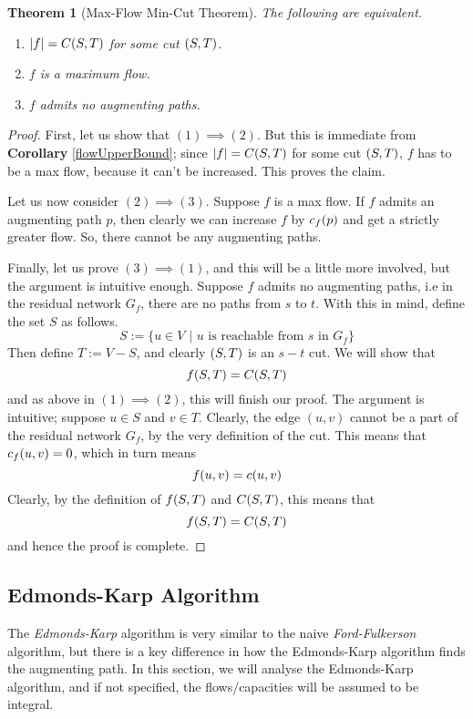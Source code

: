 \documentclass[12pt,a4paper]{amsart}
\numberwithin{equation}{section}
\newtheorem{Th}{Theorem}[section]
\theoremstyle{definition}
\begin{document}
\begin{Th}[Max-Flow Min-Cut Theorem]
	The following are equivalent. 
	\begin{enumerate}
		\item $|f| = C(S, T)$ for some cut $(S, T)$. 
		\item $f$ is a maximum flow. 
		\item $f$ admits no augmenting paths. 
	\end{enumerate}
\end{Th}
\begin{proof}
	First, let us show that $(1)\implies(2)$. But this is immediate from \textbf{Corollary} \ref{flowUpperBound}; since $|f| = C(S, T)$ for some cut $(S, T)$, $f$ has to be a max flow, because it can't be increased. This proves the claim. 
	
	Let us now consider $(2)\implies(3)$. Suppose $f$ is a max flow. If $f$ admits an augmenting path $p$, then clearly we can increase $f$ by $c_f(p)$ and get a strictly greater flow. So, there cannot be any augmenting paths. 
	
	Finally, let us prove $(3)\implies (1)$, and this will be a little more involved, but the argument is intuitive enough. Suppose $f$ admits no augmenting paths, i.e in the residual network $G_f$, there are no paths from $s$ to $t$. With this in mind, define the set $S$ as follows. 
	$$S := \{u\in V\,\,|\,\,\text{$u$ is reachable from $s$ in $G_f$}\}$$
	Then define $T := V - S$, and clearly $(S, T)$ is an $s-t$ cut. We will show that 
	$$f(S, T) = C(S, T)$$
	and as above in $(1)\implies (2)$, this will finish our proof. The argument is intuitive; suppose $u\in S$ and $v\in T$. Clearly, the edge $(u, v)$ cannot be a part of the residual network $G_f$, by the very definition of the cut. This means that $c_f(u, v) = 0$, which in turn means 
	$$f(u, v) = c(u, v)$$
	Clearly, by the definition of $f(S, T)$ and $C(S, T)$, this means that 
	$$f(S, T) = C(S, T)$$
	and hence the proof is complete. 
\end{proof}

\subsection{Edmonds-Karp Algorithm} The \textit{Edmonds-Karp} algorithm is very similar to the naive \textit{Ford-Fulkerson} algorithm, but there is a key difference in how the Edmonds-Karp algorithm finds the augmenting path. In this section, we will analyse the Edmonds-Karp algorithm, and if not specified, the flows/capacities will be assumed to be integral. 
\end{document}

